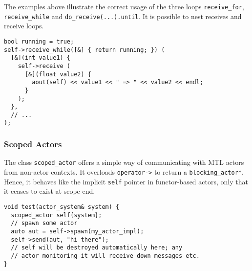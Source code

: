 The examples above illustrate the correct usage of the three loops
\lstinline^receive_for^, \lstinline^receive_while^ and
\lstinline^do_receive(...).until^. It is possible to nest receives and receive
loops.

\begin{lstlisting}
bool running = true;
self->receive_while([&] { return running; }) (
  [&](int value1) {
    self->receive (
      [&](float value2) {
        aout(self) << value1 << " => " << value2 << endl;
      }
    );
  },
  // ...
);
\end{lstlisting}

\subsubsection{Scoped Actors}
\label{scoped-actors}

The class \lstinline^scoped_actor^ offers a simple way of communicating with
MTL actors from non-actor contexts. It overloads \lstinline^operator->^ to
return a \lstinline^blocking_actor*^. Hence, it behaves like the implicit
\lstinline^self^ pointer in functor-based actors, only that it ceases to exist
at scope end.

\begin{lstlisting}
void test(actor_system& system) {
  scoped_actor self{system};
  // spawn some actor
  auto aut = self->spawn(my_actor_impl);
  self->send(aut, "hi there");
  // self will be destroyed automatically here; any
  // actor monitoring it will receive down messages etc.
}
\end{lstlisting}
